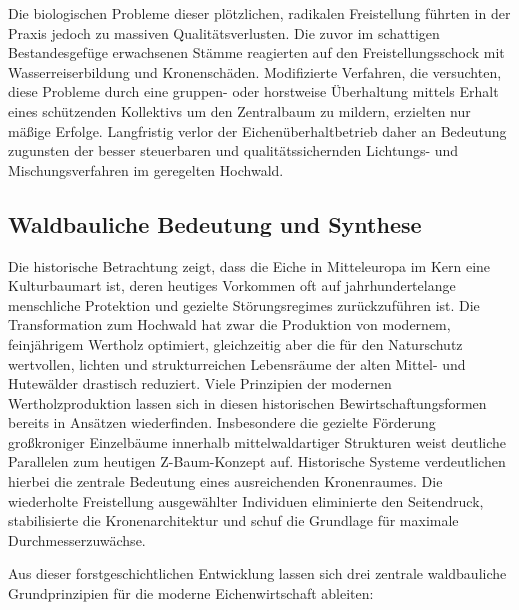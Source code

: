 \documentclass[twocolumn, bibliography=totoc, abstract=true]{scrartcl}
\begin{document}
Die biologischen Probleme dieser plötzlichen, radikalen Freistellung führten in der Praxis jedoch zu massiven Qualitätsverlusten. Die zuvor im schattigen Bestandesgefüge erwachsenen Stämme reagierten auf den Freistellungsschock mit Wasserreiserbildung und Kronenschäden. Modifizierte Verfahren, die versuchten, diese Probleme durch eine gruppen- oder horstweise Überhaltung mittels Erhalt eines schützenden Kollektivs um den Zentralbaum zu mildern, erzielten nur mäßige Erfolge. Langfristig verlor der Eichenüberhaltbetrieb daher an Bedeutung zugunsten der besser steuerbaren und qualitätssichernden Lichtungs- und Mischungsverfahren im geregelten Hochwald.

\subsection{Waldbauliche Bedeutung und Synthese}

Die historische Betrachtung zeigt, dass die Eiche in Mitteleuropa im Kern eine Kulturbaumart ist, deren heutiges Vorkommen oft auf jahrhundertelange menschliche Protektion und gezielte Störungsregimes zurückzuführen ist. Die Transformation zum Hochwald hat zwar die Produktion von modernem, feinjährigem Wertholz optimiert, gleichzeitig aber die für den Naturschutz wertvollen, lichten und strukturreichen Lebensräume der alten Mittel- und Hutewälder drastisch reduziert. Viele Prinzipien der modernen Wertholzproduktion lassen sich in diesen historischen Bewirtschaftungsformen bereits in Ansätzen wiederfinden. Insbesondere die gezielte Förderung großkroniger Einzelbäume innerhalb mittelwaldartiger Strukturen weist deutliche Parallelen zum heutigen Z-Baum-Konzept auf. Historische Systeme verdeutlichen hierbei die zentrale Bedeutung eines ausreichenden Kronenraumes. Die wiederholte Freistellung ausgewählter Individuen eliminierte den Seitendruck, stabilisierte die Kronenarchitektur und schuf die Grundlage für maximale Durchmesserzuwächse.

Aus dieser forstgeschichtlichen Entwicklung lassen sich drei zentrale waldbauliche Grundprinzipien für die moderne Eichenwirtschaft ableiten:
\end{document}

